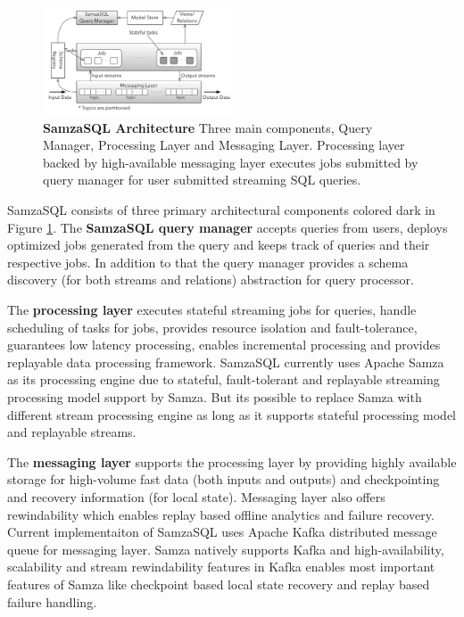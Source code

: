 \documentclass[10pt, conference, compsocconf]{IEEEtran}
\begin{document}
\begin{figure}[h!]
  \centering
  \includegraphics[width=0.5\textwidth]{samzasql-arch}
  \caption{\textbf{SamzaSQL Architecture} Three main components, Query Manager, Processing Layer and Messaging Layer. Processing layer backed by high-available messaging layer executes jobs submitted by query manager for user submitted streaming SQL queries.}
  \label{fig:arch}
\end{figure}

SamzaSQL consists of three primary architectural components colored dark in Figure \ref{fig:arch}. The \textbf{SamzaSQL query manager} accepts queries from users, deploys optimized jobs generated from the query and keeps track of queries and their respective jobs. In addition to that the query manager  provides a schema discovery (for both streams and relations) abstraction for query processor. 

The \textbf{processing layer} executes stateful streaming jobs for queries, handle scheduling of tasks for jobs, provides resource isolation and fault-tolerance, guarantees low latency processing, enables incremental processing and provides replayable data processing framework. SamzaSQL currently uses Apache Samza \cite{asf:2014:samza} as its processing engine due to stateful, fault-tolerant and replayable streaming processing model support by Samza. But its possible to replace Samza with different stream processing engine as long as it supports stateful processing model and replayable streams.

The \textbf{messaging layer} supports the processing layer by providing highly available storage for high-volume fast data (both inputs and outputs) and checkpointing and recovery information (for local state). Messaging layer also offers rewindability which enables replay based offline analytics and failure recovery. Current implementaiton of SamzaSQL uses Apache Kafka \cite{kreps2011kafka} distributed message queue for messaging layer. Samza natively supports Kafka and high-availability, scalability and stream rewindability features in Kafka enables most important features of Samza like checkpoint based local state recovery and replay based failure handling. 
\end{document}
